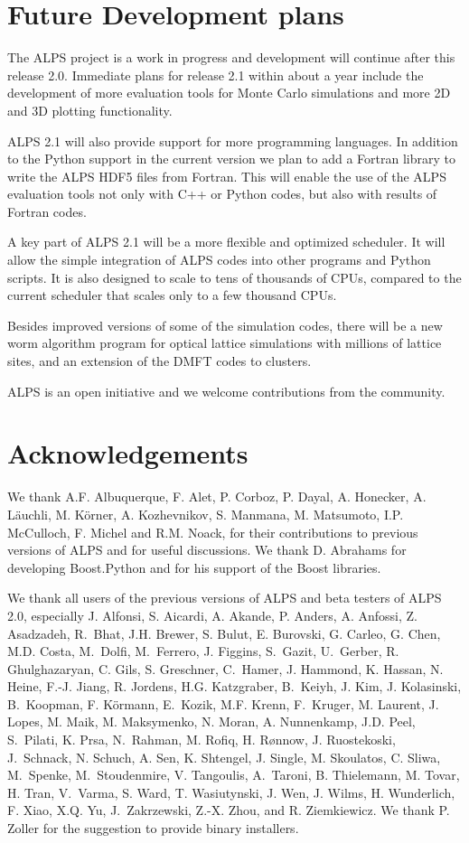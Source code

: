 \documentclass[12pt]{iopart}
\begin{document}
\section{Future Development plans}

The ALPS project is a work in progress and development will continue after this release 2.0. Immediate plans for release 2.1 within about a year include the development of more evaluation tools for Monte Carlo simulations and more 2D and 3D plotting functionality.

ALPS 2.1 will also provide support for more programming languages. In addition to the Python support in the current version we plan to add a Fortran library to write the ALPS HDF5 files from Fortran. This will enable the use of the ALPS evaluation tools not only with C++ or Python codes, but also with results of Fortran codes.

A key part of ALPS 2.1 will be a more flexible and optimized scheduler. It will allow the simple integration of ALPS codes into other programs and Python scripts. It is also designed to scale to tens of thousands of CPUs, compared to the current scheduler that scales only to a few thousand CPUs. 

Besides improved versions of some of the simulation codes, there will be a new worm algorithm program for optical lattice simulations with millions of lattice sites, and an extension of the DMFT codes to clusters.

ALPS is an open initiative and we welcome contributions from the community.


\section{Acknowledgements}

We thank A.F. Albuquerque, F. Alet, P. Corboz, P. Dayal, A. Honecker, A. L\"auchli, M. K\"orner, A. Kozhevnikov, S. Manmana, M. Matsumoto, I.P. McCulloch, F. Michel and R.M. Noack, for their contributions to previous versions of ALPS and for useful discussions. We thank D. Abrahams for developing Boost.Python and for his support of the Boost libraries.

We thank all users of the previous versions of ALPS and beta testers of ALPS 2.0, especially J. Alfonsi, S. Aicardi, A. Akande, P. Anders, A. Anfossi, Z. Asadzadeh, R.~Bhat, J.H. Brewer, S. Bulut, E. Burovski, G. Carleo, G. Chen, M.D. Costa, M.~Dolfi, M.~Ferrero, J. Figgins, S.~Gazit, U.~Gerber, R. Ghulghazaryan, C. Gils, S. Greschner, C.~Hamer, J. Hammond, K. Hassan, N. Heine, F.-J. Jiang, R. Jordens, H.G. Katzgraber, B.~Keiyh, J. Kim, J. Kolasinski, B.~Koopman, F. K\"ormann, E.~Kozik, M.F. Krenn, F.~Kruger, M. Laurent, J. Lopes, M. Maik, M. Maksymenko, N. Moran, A. Nunnenkamp, J.D. Peel, S.~Pilati, K. Prsa, N.~Rahman, M. Rofiq, H. R\o nnow, J. Ruostekoski, J.~Schnack, N. Schuch, A. Sen, K. Shtengel, J. Single, M. Skoulatos, C. Sliwa, M.~Spenke, M.~Stoudenmire, V. Tangoulis, A.~Taroni, B. Thielemann, M. Tovar, H. Tran, V.~Varma, S. Ward, T. Wasiutynski, J. Wen, J. Wilms, H. Wunderlich, F. Xiao, X.Q. Yu, J.~Zakrzewski, Z.-X. Zhou, and R. Ziemkiewicz. We thank P. Zoller for the suggestion to provide binary installers. 
\end{document}
